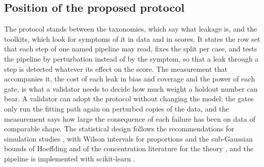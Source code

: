 \subsection{Position of the proposed protocol}

The protocol stands between the taxonomies, which say what leakage is, and the toolkits, which look for symptoms of it in data and in scores. It states the row set that each step of one named pipeline may read, fixes the split per case, and tests the pipeline by perturbation instead of by the symptom, so that a leak through a step is detected whatever its effect on the score. The measurement that accompanies it, the cost of each leak in bias and coverage and the power of each gate, is what a validator needs to decide how much weight a holdout number can bear. A validator can adopt the protocol without changing the model: the gates only run the fitting path again on perturbed copies of the data, and the measurement says how large the consequence of each failure has been on data of comparable shape. The statistical design follows the recommendations for simulation studies \citep{morris2019}, with Wilson intervals for proportions \citep{brown2001} and the sub-Gaussian bounds of Hoeffding and of the concentration literature for the theory \citep{hoeffding1963,boucheron2013}, and the pipeline is implemented with scikit-learn \citep{pedregosa2011}.
